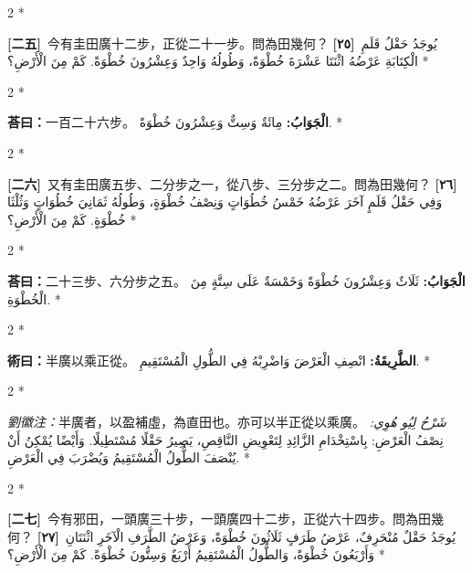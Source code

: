 \documentclass[11pt,a4paper]{article}
\newcommand{\ar}[1]{\arabicfont\beginR #1\endR}
\newcommand{\problemnum}[1]{\textbf{[\ignorespaces#1\unskip]}}
\newenvironment{bilingual}{%
  \begin{paracol}{2}%
  \switchcolumn[0]*%
}{%
  \end{paracol}%
}
\newcommand{\cnline}[1]{\switchcolumn[0]\noindent #1 \switchcolumn[1]}
\newcommand{\arline}[1]{\noindent\ar{#1} \switchcolumn[0]*}
\newenvironment{prob bilingual}{%
  \begin{paracol}{2}%
  \switchcolumn[0]*%
}{%
  \end{paracol}%
  \vspace{0.3em}%
}
\begin{document}
\begin{bilingual}
\cnline{\problemnum{二五}\, 今有圭田廣十二步，正從二十一步。問為田幾何？}
\arline{\problemnum{٢٥}\, يُوجَدُ حَقْلُ قَلَمِ الْكِتَابَةِ عَرْضُهُ اثْنَتَا عَشْرَةَ خُطْوَةً، وَطُولُهُ وَاحِدٌ وَعِشْرُونَ خُطْوَةً. كَمْ مِنَ الْأَرْضِ؟}
\end{bilingual}

\begin{bilingual}
\cnline{\textcolor{answercolor}{\textbf{荅曰：}}一百二十六步。}
\arline{\textcolor{answercolor}{\textbf{الْجَوَابُ:}} مِائَةٌ وَسِتٌّ وَعِشْرُونَ خُطْوَةً.}
\end{bilingual}

\begin{bilingual}
\cnline{\problemnum{二六}\, 又有圭田廣五步、二分步之一，從八步、三分步之二。問為田幾何？}
\arline{\problemnum{٢٦}\, وَفِي حَقْلُ قَلَمٍ آخَرَ عَرْضُهُ خَمْسُ خُطُوَاتٍ وَنِصْفُ خُطْوَةٍ، وَطُولُهُ ثَمَانِيَ خُطُوَاتٍ وَثُلْثَا خُطْوَةٍ. كَمْ مِنَ الْأَرْضِ؟}
\end{bilingual}

\begin{bilingual}
\cnline{\textcolor{answercolor}{\textbf{荅曰：}}二十三步、六分步之五。}
\arline{\textcolor{answercolor}{\textbf{الْجَوَابُ:}} ثَلَاثٌ وَعِشْرُونَ خُطْوَةً وَخَمْسَةٌ عَلَى سِتَّةٍ مِنَ الْخُطْوَةِ.}
\end{bilingual}

\begin{bilingual}
\cnline{%
\textcolor{methodcolor}{\textbf{術曰：}}半廣以乘正從。
}
\arline{%
\textcolor{methodcolor}{\textbf{الطَّرِيقَةُ:}} انْصِفِ الْعَرْضَ وَاضْرِبْهُ فِي الطُّولِ الْمُسْتَقِيمِ.
}
\end{bilingual}

\begin{bilingual}
\cnline{%
\textcolor{commentarycolor}{\small\textit{劉徽注：}}半廣者，以盈補虛，為直田也。亦可以半正從以乘廣。
}
\arline{%
\textcolor{commentarycolor}{\small\textit{شَرْحُ لِيُو هُوِي:}} نِصْفُ الْعَرْضِ: بِاسْتِخْدَامِ الزَّائِدِ لِتَعْوِيضِ النَّاقِصِ، يَصِيرُ حَقْلًا مُسْتَطِيلًا. وَأَيْضًا يُمْكِنُ أَنْ يُنْصَفَ الطُّولُ الْمُسْتَقِيمُ وَيُضْرَبَ فِي الْعَرْضِ.
}
\end{bilingual}

\begin{bilingual}
\cnline{\problemnum{二七}\, 今有邪田，一頭廣三十步，一頭廣四十二步，正從六十四步。問為田幾何？}
\arline{\problemnum{٢٧}\, يُوجَدُ حَقْلٌ مُنْحَرِفٌ، عَرْضُ طَرَفٍ ثَلَاثُونَ خُطْوَةً، وَعَرْضُ الطَّرَفِ الْآخَرِ اثْنَتَانِ وَأَرْبَعُونَ خُطْوَةً، وَالطُّولُ الْمُسْتَقِيمُ أَرْبَعٌ وَسِتُّونَ خُطْوَةً. كَمْ مِنَ الْأَرْضِ؟}
\end{bilingual}
\end{document}
